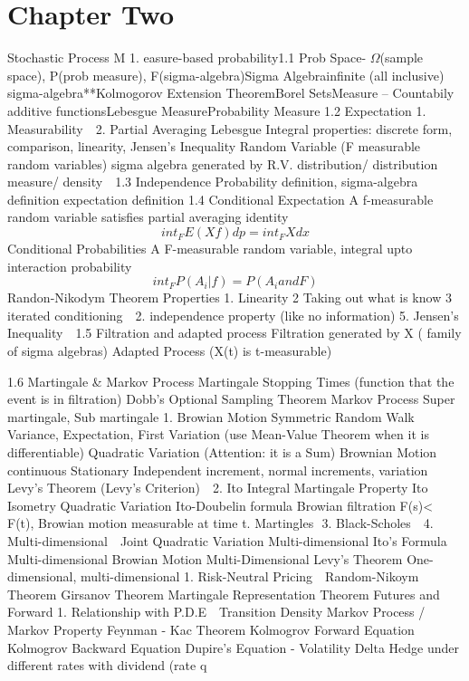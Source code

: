 \documentclass[11pt, openany]{book}              %
\begin{document}
\chapter{Chapter Two}
Stochastic Process
M
1. easure-based probability1.1 Prob Space- $\Omega$(sample space), P(prob measure), F(sigma-algebra)Sigma Algebrainfinite (all inclusive) sigma-algebra**Kolmogorov Extension TheoremBorel SetsMeasure – Countabily additive functionsLebesgue MeasureProbability Measure
1.2 Expectation
1. Measurability  
2. Partial Averaging Lebesgue Integral properties: discrete form, comparison, linearity, Jensen’s Inequality Random Variable (F measurable random variables) sigma algebra generated by R.V. distribution/ distribution measure/ density  
1.3 Independence
Probability definition, sigma-algebra definition
expectation definition
1.4 Conditional Expectation
A f-measurable random variable satisfies partial averaging identity
$$int_F E(Xf) dp = int_F Xdx$$
Conditional Probabilities
A F-measurable random variable, integral upto interaction probability
$$int_F P(A_i| f) = P(A_i and F)$$
Randon-Nikodym Theorem
Properties
1. Linearity 2 Taking out what is know 3 iterated conditioning  
2. independence property (like no information) 5. Jensen’s Inequality  
1.5 Filtration and adapted process
Filtration generated by X ( family of sigma algebras)
Adapted Process (X(t) is t-measurable)

1.6 Martingale \& Markov Process
Martingale
Stopping Times (function that the event is in filtration)
Dobb’s Optional Sampling Theorem
Markov Process
Super martingale, Sub martingale
1. Browian Motion Symmetric Random Walk Variance, Expectation, First Variation (use Mean-Value Theorem when it is differentiable) Quadratic Variation (Attention: it is a Sum) Brownian Motion continuous Stationary Independent increment, normal increments, variation Levy’s Theorem (Levy’s Criterion)  
2. Ito Integral Martingale Property Ito Isometry Quadratic Variation Ito-Doubelin formula Browian filtration F(s)< F(t), Browian motion measurable at time t. Martingles 
3. Black-Scholes  
4. Multi-dimensional  
Joint Quadratic Variation
Multi-dimensional Ito’s Formula
Multi-dimensional Browian Motion
Multi-Dimensional Levy’s Theorem
One-dimensional, multi-dimensional
1. Risk-Neutral Pricing  
Random-Nikoym Theorem
Girsanov Theorem
Martingale Representation Theorem
Futures and Forward
1. Relationship with P.D.E  
Transition Density
Markov Process / Markov Property
Feynman - Kac Theorem
Kolmogrov Forward Equation
Kolmogrov Backward Equation
Dupire’s Equation - Volatility
Delta Hedge
under different rates
with dividend (rate q
\end{document}
